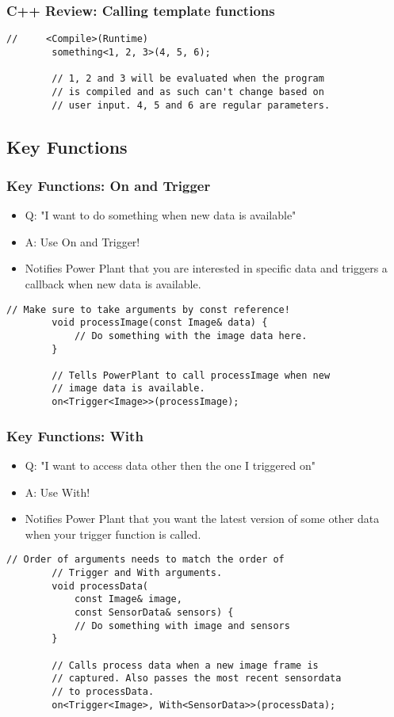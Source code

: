 \documentclass{beamer}
\begin{document}
\begin{frame}[fragile]
	\frametitle{C++ Review: Calling template functions}
	\begin{lstlisting}[language=nuclear]
		//	   <Compile>(Runtime)
		something<1, 2, 3>(4, 5, 6);

		// 1, 2 and 3 will be evaluated when the program 
		// is compiled and as such can't change based on
		// user input. 4, 5 and 6 are regular parameters.
	\end{lstlisting}
\end{frame}

\subsection{Key Functions}
\begin{frame}[fragile]
	\frametitle {Key Functions: On and Trigger}
	\begin{itemize}
		\item Q: "I want to do something when new data is available"
		\item A: Use On and Trigger!
		\item Notifies Power Plant that you are interested in specific data and triggers a callback when new data is available.
	\end{itemize}

	\begin{lstlisting}[language=nuclear]
		// Make sure to take arguments by const reference!
		void processImage(const Image& data) {
			// Do something with the image data here.
		}

		// Tells PowerPlant to call processImage when new
		// image data is available.
		on<Trigger<Image>>(processImage);
	\end{lstlisting}
\end{frame}

\begin{frame}[fragile]
	\frametitle {Key Functions: With}
	\begin{itemize}
		\item Q: "I want to access data other then the one I triggered on"
		\item A: Use With!
		\item Notifies Power Plant that you want the latest version of some other data when your trigger function is called.
	\end{itemize}

	\begin{lstlisting}[language=nuclear]
		// Order of arguments needs to match the order of 
		// Trigger and With arguments.
		void processData(
			const Image& image,
			const SensorData& sensors) {
			// Do something with image and sensors
		}

		// Calls process data when a new image frame is 
		// captured. Also passes the most recent sensordata
		// to processData.
		on<Trigger<Image>, With<SensorData>>(processData);
	\end{lstlisting}
\end{frame}
\end{document}

